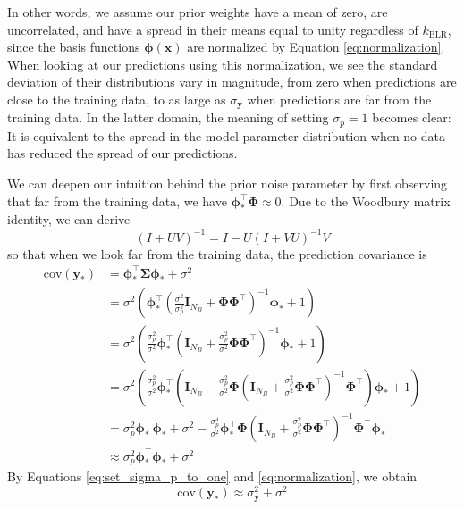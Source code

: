 \documentclass{article}
\begin{document}
In other words, we assume our prior weights have a mean of zero, are uncorrelated, and have a spread in their means equal to unity regardless of $k_\text{BLR}$, since the basis functions $\boldsymbol{\phi}(\mathbf{x})$ are normalized by Equation \ref{eq:normalization}. When looking at our predictions using this normalization, we see the standard deviation of their distributions vary in magnitude, from zero when predictions are close to the training data, to as large as $\sigma_\mathbf{y}$ when predictions are far from the training data. In the latter domain, the meaning of setting $\sigma_p=1$ becomes clear: It is equivalent to the spread in the model parameter distribution when no data has reduced the spread of our predictions.

We can deepen our intuition behind the prior noise parameter by first observing that far from the training data, we have $\boldsymbol{\phi}_\ast^\top\boldsymbol{\Phi}\approx 0$. Due to the Woodbury matrix identity, we can derive
\begin{equation}
    \left(I + UV \right)^{-1} = I -U \left(I + VU \right)^{-1} V
\end{equation}so that when we look far from the training data, the prediction covariance is
\begin{equation}
\begin{split}
\text{cov}(\mathbf{y}_\ast)&=\boldsymbol{\phi}_\ast^\top\boldsymbol{\Sigma}\boldsymbol{\phi}_\ast + \sigma^2  \\ 
&=  \sigma^2\left( \boldsymbol{\phi}_\ast^\top\left(\frac{\sigma^2}{\sigma_p^2}\mathbf{I}_{N_B}+\boldsymbol{\Phi}\boldsymbol{\Phi}^\top\right)^{-1}\boldsymbol{\phi}_\ast+1\right) \\
&= \sigma^2\left( \frac{\sigma_p^2}{\sigma^2}\boldsymbol{\phi}_\ast^\top\left(\mathbf{I}_{N_B}+\frac{\sigma_p^2}{\sigma^2}\boldsymbol{\Phi}\boldsymbol{\Phi}^\top\right)^{-1}\boldsymbol{\phi}_\ast+1\right) \\
&= \sigma^2\left( \frac{\sigma_p^2}{\sigma^2}\boldsymbol{\phi}_\ast^\top\left(\mathbf{I}_{N_B}-\frac{\sigma_p^2}{\sigma^2}\boldsymbol{\Phi}\left(\mathbf{I}_{N_B}+\frac{\sigma_p^2}{\sigma^2}\boldsymbol{\Phi}\boldsymbol{\Phi}^\top\right)^{-1}\boldsymbol{\Phi}^\top\right)\boldsymbol{\phi}_\ast+1\right) \\
&= \sigma_p^2\boldsymbol{\phi}_\ast^\top\boldsymbol{\phi}_\ast + \sigma^2 -\frac{\sigma_p^4}{\sigma^2}\boldsymbol{\phi}_\ast^\top\boldsymbol{\Phi}\left(\mathbf{I}_{N_B}+\frac{\sigma_p^2}{\sigma^2}\boldsymbol{\Phi}\boldsymbol{\Phi}^\top\right)^{-1}\boldsymbol{\Phi}^\top\boldsymbol{\phi}_\ast \\
&\approx\sigma_p^2\boldsymbol{\phi}_\ast^\top\boldsymbol{\phi}_\ast + \sigma^2
\end{split}
\end{equation} 
By Equations \ref{eq:set_sigma_p_to_one} and \ref{eq:normalization}, we obtain 
\begin{equation}
\text{cov}(\mathbf{y}_\ast)\approx\sigma_\mathbf{y}^2 + \sigma^2
\end{equation}
\end{document}
